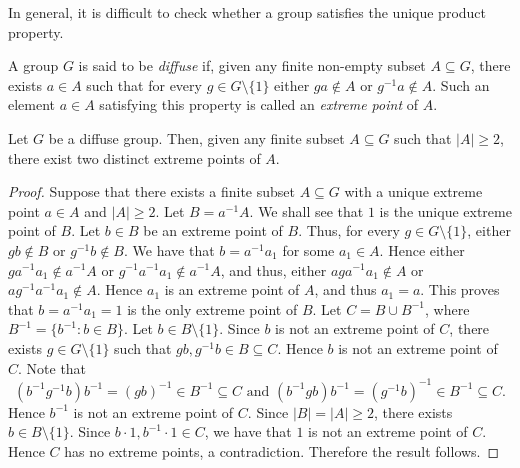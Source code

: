 In general, it is difficult to check whether a group satisfies the unique product property. 

\begin{definition}
	A group $G$ is said to be {\em diffuse} if, given any finite non-empty subset $A\subseteq G$, 
	there exists $a\in A$ such that for every $g\in G\setminus\{ 1\}$ either 
	$ga\notin A$ or $g^{-1}a\notin A$. Such an element $a\in A$ satisfying this property 
	is called an {\em extreme point} of $A$.  
\end{definition}

\begin{proposition} \label{prop:LinellMW}
Let $G$ be a diffuse group. Then, given any finite subset $A\subseteq G$ such that $|A|\geq 2$, there exist two distinct extreme points of $A$. 
\end{proposition}

\begin{proof}
Suppose that there exists a finite subset $A\subseteq G$ with a unique extreme point $a\in A$ and $|A|\geq 2$.
Let $B=a^{-1}A$. We shall see that $1$ is the unique extreme point of $B$. Let $b\in B$ be an extreme point of $B$. Thus, for every $g\in G\setminus\{ 1\}$, either $gb\notin B$ or $g^{-1}b\notin B$. We have that $b=a^{-1}a_1$ for some $a_1\in A$. Hence either $ga^{-1}a_1\notin a^{-1}A$ or $g^{-1}a^{-1}a_1\notin a^{-1}A$, and thus, either $aga^{-1}a_1\notin A$ or $ag^{-1}a^{-1}a_1\notin A$. Hence $a_1$ is an extreme point of $A$, and thus $a_1=a$. This proves that $b=a^{-1}a_1=1$ is the only extreme point of $B$. Let $C=B\cup B^{-1}$, where $B^{-1}=\{ b^{-1} : b\in B\}$. Let $b\in B\setminus\{ 1\}$. Since $b$ is not  an extreme point of $C$, there exists $g\in G\setminus\{ 1\}$ such that $gb,g^{-1}b\in B\subseteq C$. Hence $b$ is not an extreme point of $C$. Note that
\[ (b^{-1}g^{-1}b)b^{-1}=(gb)^{-1}\in B^{-1}\subseteq C\text{ and }(b^{-1}gb)b^{-1}=(g^{-1}b)^{-1}\in B^{-1}\subseteq C.\]
Hence $b^{-1}$ is not an extreme point of $C$. Since $|B|=|A|\geq 2$, there exists $b\in B\setminus\{ 1\}$. Since $b\cdot 1,b^{-1}\cdot 1\in C$, we have that $1$ is not an extreme point of $C$. Hence $C$ has no extreme points, a contradiction. Therefore the result follows. 
\end{proof}


